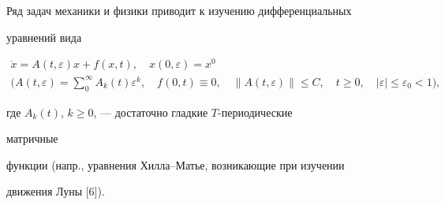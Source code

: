 


Ряд задач механики и физики приводит к изучению дифференциальных 


уравнений вида 


\begin{equation} 


\begin{array}{c} 


\Dot x=A(t,\varepsilon)x+f(x,t),\quad x(0,\varepsilon)=x^0\\[3mm] 


\displaystyle\bigg(A(t,\varepsilon)=\sum^\infty_0 A_k(t) 


\varepsilon^k,\quad f(0,t)\equiv0,\quad 


\|A(t,\varepsilon)\|\le C,\quad t\ge 0,\quad 


|\varepsilon|\le\varepsilon_0<1\bigg), 


\end{array} 


\end{equation} 


где $A_k(t)$, $k\ge0$, --- достаточно гладкие $T$-периодические 


матричные  


функции (напр., уравнения Хилла--Матье, возникающие при изучении 


движения Луны [6]). 


 


